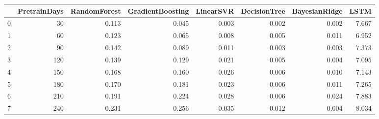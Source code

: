 \begin{tabular}{lrrrrrrr}
\toprule
{} &  PretrainDays &  RandomForest &  GradientBoosting &  LinearSVR &  DecisionTree &  BayesianRidge &  LSTM \\
\midrule
0 &            30 &         0.113 &             0.045 &      0.003 &         0.002 &          0.002 & 7.667 \\
1 &            60 &         0.123 &             0.065 &      0.008 &         0.005 &          0.011 & 6.952 \\
2 &            90 &         0.142 &             0.089 &      0.011 &         0.003 &          0.003 & 7.373 \\
3 &           120 &         0.139 &             0.129 &      0.021 &         0.005 &          0.004 & 7.095 \\
4 &           150 &         0.168 &             0.160 &      0.026 &         0.006 &          0.010 & 7.143 \\
5 &           180 &         0.170 &             0.181 &      0.023 &         0.006 &          0.011 & 7.265 \\
6 &           210 &         0.191 &             0.224 &      0.028 &         0.006 &          0.024 & 7.883 \\
7 &           240 &         0.231 &             0.256 &      0.035 &         0.012 &          0.004 & 8.034 \\
\bottomrule
\end{tabular}

